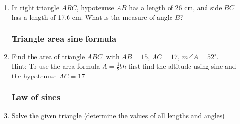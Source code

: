\documentclass[12pt, twoside]{article}
\begin{document}
\begin{enumerate}
\newpage
   \item In right triangle $ABC$, hypotenuse $\overline{AB}$ has a length of 26 cm, and side $\overline{BC}$ has a length of 17.6 cm. What is the measure of angle $B$?

\newpage
\subsubsection*{Triangle area sine formula}
   \item Find the area of triangle $ABC$, with $AB=15$, $AC=17$, $m\angle A = 52^\circ$. \\[0.5cm]
   Hint: To use the area formula $A = \frac{1}{2} bh$ first find the altitude using sine and the hypotenuse $AC=17$.
   \begin{flushleft}
     \end{flushleft} 

\newpage
\subsubsection*{Law of sines}
  \item Solve the given triangle (determine the values of all lengths and angles)
  \begin{center}
    \end{center}

\newpage

\end{enumerate}
\end{document}
